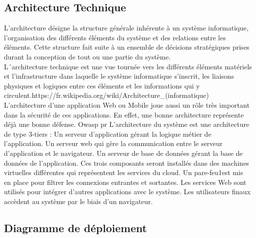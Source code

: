 \subsection{Architecture Technique}
L’architecture désigne la structure générale inhérente à un système informatique, l'organisation des différents éléments du système et des relations entre les éléments. Cette structure fait suite à un ensemble de décisions stratégiques prises durant la conception de tout ou une partie du système.\\
L´architecture technique est une vue tournée vers les différents éléments matériels et l'infrastructure dans laquelle le système informatique s'inscrit, les liaisons physiques et logiques entre ces éléments et les informations qui y circulent.https://fr.wikipedia.org/wiki/Architecture_(informatique)\\
L'architecture d'une application Web ou Mobile joue aussi un rôle très important dans la sécurité de ces applications. En effet, une bonne architecture représente déjà une bonne défense. Owasp pr
L’architecture du système est une architecture de type 3-tiers :
Un serveur d’application gérant la logique métier de l’application.
Un serveur web qui gère la communication entre le serveur d’application et le navigateur.
Un serveur de base de données gérant la base de données de l’application.
Ces trois composants seront installés dans des machines virtuelles différentes qui représentent les services du cloud.
Un pare-feu1est mis en place pour filtrer les connexions entrantes et sortantes. Les services Web sont utilisés pour intégrer d’autres applications avec le système.
Les utilisateurs finaux accèdent au système par le biais d’un navigateur.
\subsection{Diagramme de déploiement}

